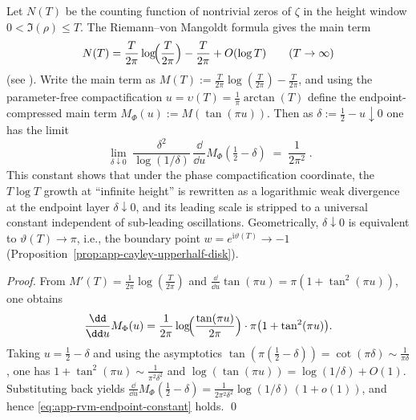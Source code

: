 \begin{remark}\label{rem:app-rvm-endpoint-constant}
Let \(N(T)\) be the counting function of nontrivial zeros of \(\zeta\) in the height window \(0<\Im(\rho)\le T\).
The Riemann--von Mangoldt formula gives the main term
\[
N(T)=\frac{T}{2\pi}\log\!\Bigl(\frac{T}{2\pi}\Bigr)-\frac{T}{2\pi}+O(\log T)\qquad(T\to\infty)
\]
(see \cite{Apostol1976}).
Write the main term as
\(
M(T):=\frac{T}{2\pi}\log(\frac{T}{2\pi})-\frac{T}{2\pi}
\), and using the parameter-free compactification \(u=\upsilon(T)=\frac{1}{\pi}\arctan(T)\) define the endpoint-compressed main term
\(
M_{\Phi}(u):=M(\tan(\pi u))
\).
Then as \(\delta:=\tfrac12-u\downarrow 0\) one has the limit
\begin{equation}\label{eq:app-rvm-endpoint-constant}
\boxed{\;
\lim_{\delta\downarrow 0}\;
\frac{\delta^{2}}{\log(1/\delta)}\,
\frac{\dd}{\dd u}M_{\Phi}\!\left(\tfrac12-\delta\right)
\;=\;\frac{1}{2\pi^{2}}\; }.
\end{equation}
This constant shows that under the phase compactification coordinate, the \(T\log T\) growth at ``infinite height'' is rewritten as a logarithmic weak divergence at the endpoint layer \(\delta\downarrow 0\), and its leading scale is stripped to a universal constant independent of sub-leading oscillations.
Geometrically, \(\delta\downarrow 0\) is equivalent to \(\vartheta(T)\to\pi\), i.e., the boundary point \(w=e^{\mathrm{i}\vartheta(T)}\to-1\) (Proposition~\ref{prop:app-cayley-upperhalf-disk}).
\end{remark}
\begin{proof}
From \(M'(T)=\frac{1}{2\pi}\log(\frac{T}{2\pi})\) and \(\frac{\dd}{\dd u}\tan(\pi u)=\pi(1+\tan^2(\pi u))\), one obtains
\[
\frac{\dd}{\dd u}M_{\Phi}(u)
=\frac{1}{2\pi}\log\!\Bigl(\frac{\tan(\pi u)}{2\pi}\Bigr)\cdot \pi\bigl(1+\tan^2(\pi u)\bigr).
\]
Taking \(u=\tfrac12-\delta\) and using the asymptotics \(\tan(\pi(\tfrac12-\delta))=\cot(\pi\delta)\sim \frac{1}{\pi\delta}\), one has
\(
1+\tan^2(\pi u)\sim \frac{1}{\pi^2\delta^2}
\)
and
\(
\log(\tan(\pi u))=\log(1/\delta)+O(1)
\).
Substituting back yields
\(
\frac{\dd}{\dd u}M_{\Phi}(\tfrac12-\delta)
=\frac{1}{2\pi^{2}\delta^{2}}\log(1/\delta)\,(1+o(1))
\), and hence \eqref{eq:app-rvm-endpoint-constant} holds. \qed
\end{proof}

